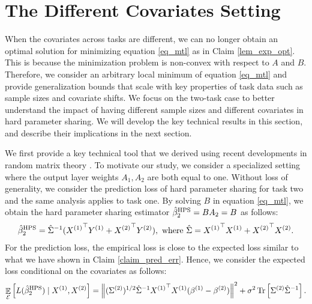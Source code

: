 \section{The Different Covariates Setting}\label{sec_diff}

When the covariates across tasks are different, we can no longer obtain an optimal solution for minimizing equation \eqref{eq_mtl} as in Claim \ref{lem_exp_opt}.
This is because the minimization problem is non-convex with respect to $A$ and $B$.
Therefore, we consider an arbitrary local minimum of equation \eqref{eq_mtl} and provide generalization bounds that scale with key properties of task data such as sample sizes and covariate shifts.
We focus on the two-task case to better understand the impact of having different sample sizes and different covariates in hard parameter sharing.
We will develop the key technical results in this section, and describe their implications in the next section.

We first provide a key technical tool that we derived using recent developments in random matrix theory \cite{??}.
To motivate our study, we consider a specialized setting where the output layer weights $A_1, A_2$ are both equal to one.
Without loss of generality, we consider the prediction loss of hard parameter sharing for task two and the same analysis applies to task one.
By solving $B$ in equation \eqref{eq_mtl}, we obtain the hard parameter sharing estimator $\hat{\beta}_2^{\textup{HPS}} = B A_2 = B$ as follows:
\begin{align*}
	\hat{\beta}_2^{\textup{HPS}} = {\hat{\Sigma}}^{-1} ({X^{(1)}}^{\top} Y^{(1)} + {X^{(2)}}^{\top} Y^{(2)}), \text{ where } \hat{\Sigma} = {X^{(1)}}^{\top} X^{(1)} + {X^{(2)}}^{\top} X^{(2)}.
\end{align*}
For the prediction loss, the empirical loss is close to the expected loss similar to what we have shown in Claim \ref{claim_pred_err}.
Hence, we consider the expected loss conditional on the covariates as follows:
\begin{align}\label{eq_diff_cov}
	\mathop{\mathbb{E}}_{\mathcal{E}}\left[ L(\hat{\beta}_2^{\textup{HPS}}) \mid X^{(1)}, X^{(2)} \right] =
	\left\| (\Sigma^{(2)})^{1/2} \hat{\Sigma}^{-1} {X^{(1)}}^{\top} X^{(1)} (\beta^{(1)} - \beta^{(2)}) \right\|^2
	+ \sigma^2 \operatorname{Tr}\left[\Sigma^{(2)}\hat{\Sigma}^{-1}\right].
\end{align}

